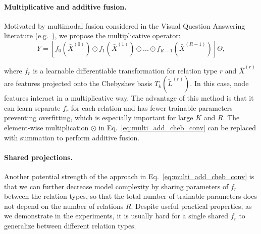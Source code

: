\documentclass[final,nonatbib]{article} \usepackage{nips_2018}
\begin{document}
	\paragraph{Multiplicative and additive fusion.}
	Motivated by multimodal fusion considered in the Visual Question Answering literature (e.g.~\cite{kim2016hadamard}), we propose the multiplicative operator:
	\begin{equation}
	\label{eq:multi_add_cheb_conv}
	Y = [f_{0}(\bar{X}^{(0)}) \odot f_{1}(\bar{X}^{(1)}) \odot ... \odot f_{R-1}(\bar{X}^{(R-1)})]  \Theta,
	\end{equation}

	where $f_r$ is a learnable differentiable transformation for relation type $r$ and $\bar{X}^{(r)}$ are features projected onto the Chebyshev basis $T_k(\tilde{L}^{(r)})$.
	In this case, node features interact in a multiplicative way. The advantage of this method is that it can learn separate $f_r$ for each relation and has fewer trainable parameters preventing overfitting, which is especially important for large $K$ and $R$.
	The element-wise multiplication $\odot$ in Eq.~\ref{eq:multi_add_cheb_conv} can be replaced with summation to perform additive fusion.

	 \paragraph{Shared projections.}
	 Another potential strength of the approach in Eq.~\ref{eq:multi_add_cheb_conv} is that we can further decrease model complexity by sharing parameters of $f_r$ between the relation types, so that the total number of trainable parameters does not depend on the number of relations $R$. Despite useful practical properties, as we demonstrate in the experiments, it is usually hard for a single shared $f_r$ to generalize between different relation types.
\end{document}

